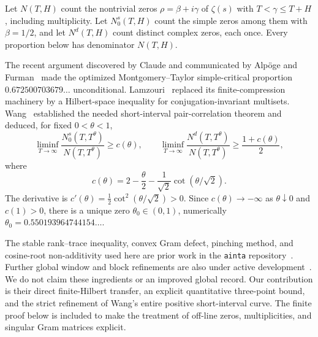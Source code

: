 \documentclass[11pt]{article}
\theoremstyle{remark}
\begin{document}
Let $N(T,H)$ count the nontrivial zeros $\rho=\beta+i\gamma$ of $\zeta(s)$
with $T<\gamma\le T+H$, including multiplicity. Let $N_0^s(T,H)$ count the
simple zeros among them with $\beta=1/2$, and let $N^d(T,H)$ count distinct
complex zeros, each once. Every proportion below has denominator $N(T,H)$.

The recent argument discovered by Claude and communicated by Alp\"oge and
Furman~\cite{AF} made the optimized Montgomery--Taylor simple-critical
proportion $0.672500703679\ldots$ unconditional. Lamzouri~\cite{Lamzouri}
replaced its finite-compression machinery by a Hilbert-space inequality for
conjugation-invariant multisets. Wang~\cite{Wang} established the needed
short-interval pair-correlation theorem and deduced, for fixed $0<\theta<1$,
\begin{equation}\label{eq:wang}
 \liminf_{T\to\infty}\frac{N_0^s(T,T^\theta)}{N(T,T^\theta)}\ge c(\theta),
 \qquad
 \liminf_{T\to\infty}\frac{N^d(T,T^\theta)}{N(T,T^\theta)}
 \ge\frac{1+c(\theta)}2,
\end{equation}
where
\begin{equation}\label{eq:c}
 c(\theta)=2-\frac\theta2-\frac1{\sqrt2}\cot(\theta/\sqrt2).
\end{equation}
The derivative is $c'(\theta)=\tfrac12\cot^2(\theta/\sqrt2)>0$. Since
$c(\theta)\to-\infty$ as $\theta\downarrow0$ and $c(1)>0$, there is a
unique zero $\theta_0\in(0,1)$, numerically
$\theta_0=0.550193964744154\ldots$.

The stable rank--trace inequality, convex Gram defect, pinching method, and
cosine-root non-additivity used here are prior work in the
\texttt{ainta} repository~\cite{Ainta}. Further global window and block
refinements are also under active development~\cite{Trmdy}. We do not claim
these ingredients or an improved global record. Our contribution is their
direct finite-Hilbert transfer, an explicit quantitative three-point bound,
and the strict refinement of Wang's entire positive short-interval curve.
The finite proof below is included to make the treatment of off-line zeros,
multiplicities, and singular Gram matrices explicit.
\end{document}
